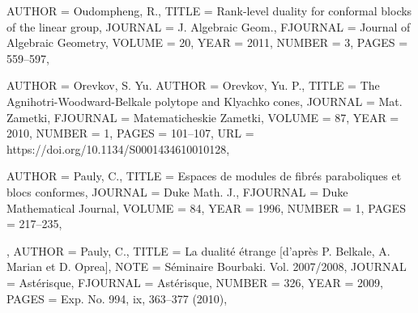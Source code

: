 \begin{bibdiv}
\begin{biblist}
 {
    AUTHOR = {Oudompheng, R.},
     TITLE = {Rank-level duality for conformal blocks of the linear group},
   JOURNAL = {J. Algebraic Geom.},
  FJOURNAL = {Journal of Algebraic Geometry},
    VOLUME = {20},
      YEAR = {2011},
    NUMBER = {3},
     PAGES = {559--597},
}


 {
    AUTHOR = {Orevkov, S. Yu.}
    AUTHOR = {Orevkov, Yu. P.},
     TITLE = {The {A}gnihotri-{W}oodward-{B}elkale polytope and {K}lyachko
              cones},
   JOURNAL = {Mat. Zametki},
  FJOURNAL = {Matematicheskie Zametki},
    VOLUME = {87},
      YEAR = {2010},
    NUMBER = {1},
     PAGES = {101--107},
       URL = {https://doi.org/10.1134/S0001434610010128},
}

 {
    AUTHOR = {Pauly, C.},
     TITLE = {Espaces de modules de fibr\'{e}s paraboliques et blocs conformes},
   JOURNAL = {Duke Math. J.},
  FJOURNAL = {Duke Mathematical Journal},
    VOLUME = {84},
      YEAR = {1996},
    NUMBER = {1},
     PAGES = {217--235},
}

 {,
    AUTHOR = {Pauly, C.},
     TITLE = {La dualit\'{e} \'{e}trange [d'apr\`es {P}. {B}elkale, {A}. {M}arian et
              {D}. {O}prea]},
      NOTE = {S\'{e}minaire Bourbaki. Vol. 2007/2008},
   JOURNAL = {Ast\'{e}risque},
  FJOURNAL = {Ast\'{e}risque},
    NUMBER = {326},
      YEAR = {2009},
     PAGES = {Exp. No. 994, ix, 363--377 (2010)},
}


\end{biblist}
\end{bibdiv}
